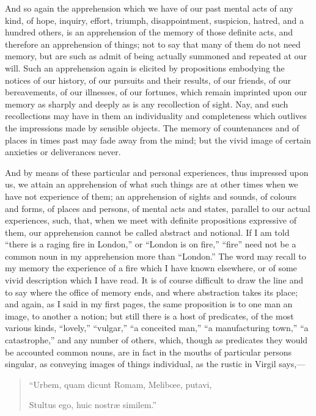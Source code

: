 And so again the apprehension which we have of our past mental acts
of any kind, of hope, inquiry, effort, triumph, disappointment,
suspicion, hatred, and a hundred others, is an apprehension of the
memory of those definite acts, and therefore an apprehension of
things; not to say that many of them do not need memory, but are such
as admit of being actually summoned and repeated at our will. Such an
apprehension again is elicited by propositions embodying the notices
of our history, of our pursuits and their results, of our friends, of
our bereavements, of our illnesses, of our fortunes, which remain
imprinted upon our memory as sharply and deeply as is any recollection
of sight. Nay, and such recollections may have in them an
individuality and completeness which outlives the impressions made by
sensible objects. The memory of countenances and of places in times
past may fade away from the mind; but the vivid image of certain
anxieties or deliverances never.

And by means of these particular and personal experiences, thus impressed upon us, we attain an apprehension of what such things
are at other times when we have not experience of them; an
apprehension of sights and sounds, of colours and forms, of places and
persons, of mental acts and states, parallel to our actual
experiences, such, that, when we meet with definite propositions
expressive of them, our apprehension cannot be called abstract and
notional. If I am told ``there is a raging fire in London,''
or ``London is on fire,'' ``fire'' need not be a
common noun in my apprehension more than ``London.'' The word
may recall to my memory the experience of a fire which I have known
elsewhere, or of some vivid description which I have read. It is of
course difficult to draw the line and to say where the office of
memory ends, and where abstraction takes its place; and again, as I
said in my first pages, the same proposition is to one man an image,
to another a notion; but still there is a host of predicates, of the
most various kinds, ``lovely,'' ``vulgar,'' ``a
conceited man,'' ``a manufacturing town,'' ``a
catastrophe,'' and any number of others, which, though as
predicates they would be accounted common nouns, are in fact in the
mouths of particular persons singular, as conveying images of things
individual, as the rustic in Virgil says,—

\begin{quote}

``Urbem, quam dicunt Romam, Melibœe, putavi,

Stultus ego, huic nostræ similem.''

\end{quote}

